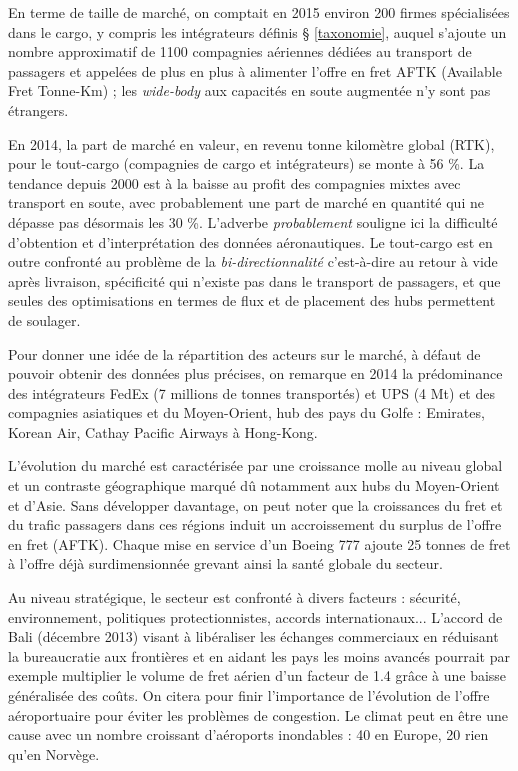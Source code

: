 En terme de taille de marché, on comptait en 2015 environ 200 firmes spécialisées dans le cargo, y compris les intégrateurs définis § \ref{taxonomie}, auquel s'ajoute un nombre approximatif de 1100 compagnies aériennes dédiées au transport de passagers et appelées de plus en plus à alimenter l'offre en fret AFTK (Available Fret Tonne-Km) ; les \textit{wide-body} aux capacités en soute augmentée n'y sont pas étrangers.

En 2014, la part de marché en valeur, en revenu tonne kilomètre global (RTK), pour le tout-cargo (compagnies de cargo et intégrateurs) se monte à 56 \%. La tendance depuis 2000 est à la baisse au profit des compagnies mixtes avec transport en soute, avec probablement une part de marché en quantité qui ne dépasse pas désormais les 30 \%. L'adverbe \textit{probablement} souligne ici la difficulté d'obtention et d'interprétation des données aéronautiques. Le tout-cargo est en outre confronté au problème de la \textit{bi-directionnalité} c'est-à-dire au retour à vide après livraison, spécificité qui n'existe pas dans le transport de passagers, et que seules des optimisations en termes de flux et de placement des hubs permettent de soulager.

Pour donner une idée de la répartition des acteurs sur le marché, à défaut de pouvoir obtenir des données plus précises, on remarque en 2014 la prédominance des intégrateurs FedEx (7 millions de tonnes transportés) et UPS (4 Mt) et des compagnies asiatiques et du Moyen-Orient, hub des pays du Golfe : Emirates, Korean Air, Cathay Pacific Airways à Hong-Kong. \cite{top50}

L'évolution du marché est caractérisée par une croissance molle au niveau global et un contraste géographique marqué dû notamment aux hubs du Moyen-Orient et d'Asie. Sans développer davantage, on peut noter que la croissances du fret et du trafic passagers dans ces régions induit un accroissement du surplus de l'offre en fret (AFTK). Chaque mise en service d'un Boeing 777 ajoute 25 tonnes de fret 
à l'offre déjà surdimensionnée grevant ainsi la santé globale du secteur. \cite{theEconomist01}


Au niveau stratégique, le secteur est confronté à divers facteurs : sécurité, environnement, politiques protectionnistes, accords internationaux... L'accord de Bali (décembre 2013) visant à libéraliser les échanges commerciaux en réduisant la bureaucratie aux frontières et en aidant les pays les moins avancés pourrait par exemple multiplier le volume de fret aérien d'un facteur de 1.4 grâce à une baisse généralisée des coûts. \cite{iata.org01} On citera pour finir l'importance
de l'évolution de l'offre aéroportuaire pour éviter les problèmes de congestion.
Le climat peut en être une cause avec un nombre croissant d'aéroports inondables : 40 en Europe, 20 rien qu'en Norvège.